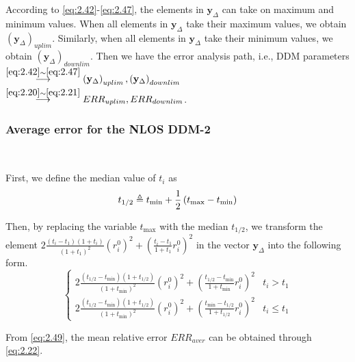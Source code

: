 \documentclass[journal]{IEEEtran}
\begin{document}
According to \eqref{eq:2.42}-\eqref{eq:2.47}, the elements in $\mathbf{y}_{\Delta}$ can take on maximum and minimum values. When all elements in $\mathbf{y}_{\Delta}$ take their maximum values, we obtain $\left(\mathbf{y}_{\Delta}\right)_{uplim}$. Similarly, when all elements in $\mathbf{y}_{\Delta}$ take their minimum values, we obtain $\left(\mathbf{y}_{\Delta}\right)_{downlim}$. Then we have the error analysis path, i.e., DDM parameters$ \stackrel{\eqref{eq:2.42}\sim \eqref{eq:2.47}}{\longrightarrow} \left(\mathbf{y}_{\Delta}\right)_{uplim}, \left(\mathbf{y}_{\Delta}\right)_{downlim}$ $\stackrel{\eqref{eq:2.20}\sim \eqref{eq:2.21}}{\longrightarrow} {ERR}_{uplim}, {ERR}_{downlim}$.

\subsubsection{{Average error for the NLOS DDM-2}}
\

First, we define the median value of $t_i$ as
\begin{equation}\label{eq:2.48}
   \setlength{\abovedisplayskip}{3pt}
   {t_{1/2}} \triangleq {t_{\min}}+ \frac{1}{2}\left({t_{\max}}-{t_{\min}}\right)
   \setlength{\belowdisplayskip}{3pt}
   \end{equation}

Then, by replacing the variable ${t_{\max}}$ with the median ${t_{1/2}}$, we transform the element $2{\frac{{\left({t_{i}}-{t_{1}}\right)\left({1+{t_{i}}}\right)}}{\left(1+{t_{1}}\right)^2}}\left({r_{i}^{0}}\right)^2+\left({\frac{{t_{i}}-{t_{1}}}{1+{t_{1}}}}{r_{i}^{0}}\right)^2$ in the vector $\mathbf{y}_{\Delta}$ into the following form.
 \begin{equation}\label{eq:2.49}
\begin{cases}
{2{\frac{{\left({t_{1/2}}\!-\!{t_{\min}}\right)\left({1\!+\!{t_{1/2}}}\right)}}{\left(1\!+\!{t_{\min}}\right)^2}}\left({r_{i}^{0}}\right)^2\!+\!\left({\frac{{t_{1/2}}\!-\!{t_{\min}}}{1\!+\!{t_{\min}}}}{r_{i}^{0}}\right)^2} & {{t_i}\!>\!{t_1}} \\
{2{\frac{{\left({t_{1/2}}\!-\!{t_{\min}}\right)\left({1\!+\!{t_{1/2}}}\right)}}{\left(1\!+\!{t_{\min}}\right)^2}}\left({r_{i}^{0}}\right)^2+\left({\frac{{t_{\min}}\!-\!{t_{1/2}}}{1\!+\!{t_{1/2}}}}{r_{i}^{0}}\right)^2} & {{t_i}\!\leq\!{t_1}}
\end{cases}
\end{equation}

From \eqref{eq:2.49}, the mean relative error ${ERR}_{aver}$ can be obtained through \eqref{eq:2.22}.
\end{document}

